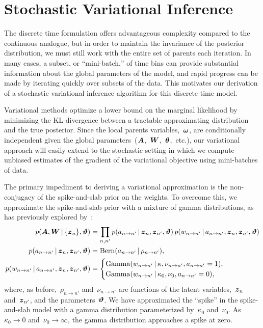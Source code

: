 \section{Stochastic Variational Inference}
The discrete time formulation offers advantageous complexity compared
to the continuous analogue, but in order to maintain the invariance of
the posterior distribution, we must still work with the entire set of
parents each iteration. In many cases, a subset, or ``mini-batch,'' of
time bins can provide substantial information about the global
parameters of the model, and rapid progress can be made by iterating
quickly over subsets of the data. This motivates our derivation of a
stochastic variational inference algorithm \citep{Hoffman-2013}
for this discrete time model.

Variational methods optimize a lower bound on the marginal likelihood
by minimizing the KL-divergence between a tractable approximating
distribution and the true posterior. Since the local parents
variables,~$\boldsymbol{\omega}$, are conditionally independent given the global
parameters~($\boldsymbol{A}$,~$\boldsymbol{W}$,~$\boldsymbol{\theta}$,~etc.), our variational approach will
easily extend to the stochastic setting in which we compute unbiased
estimates of the gradient of the variational objective using
mini-batches of data.

The primary impediment to deriving a variational approximation is the
non-conjugacy of the spike-and-slab prior on the weights.  To overcome
this, we approximate the spike-and-slab prior with a mixture of gamma
distributions, as has previously explored by~\citet{Grabska-2013}:
\begin{align*}
  p(\boldsymbol{A}, \boldsymbol{W} \,|\, \{\boldsymbol{z}_n\}, \boldsymbol{\vartheta})
  &= \prod_{n,n'} p(a_{n \to n'} \,|\, \boldsymbol{z}_n, \boldsymbol{z}_{n'}, \boldsymbol{\vartheta}) \, p(w_{n \to n'} \,|\, a_{n \to n'}, \boldsymbol{z}_n, \boldsymbol{z}_{n'}, \boldsymbol{\vartheta}) \\
  p(a_{n \to n'} \,|\, \boldsymbol{z}_n, \boldsymbol{z}_{n'}, \boldsymbol{\vartheta}) &= \mathrm{Bern}(a_{n \to n'} \,|\, \rho_{n \to n'}), \\
  p(w_{n \to n'} \,|\, a_{n \to n'}, \boldsymbol{z}_n, \boldsymbol{z}_{n'}, \boldsymbol{\vartheta})
  &=
  \begin{cases} 
    \mathrm{Gamma}(w_{n \to n'} \,|\, \kappa, \nu_{n \to n'}, a_{n \to n'} =1), \\
    \mathrm{Gamma}(w_{n \to n'} \,|\, \kappa_0, \nu_0, a_{n \to n'} =0),
  \end{cases}
\end{align*}
where, as before,~$\rho_{n \to n'}$ and~$\nu_{n \to n'}$ are functions
of the latent variables,~$\boldsymbol{z}_n$ and~$\boldsymbol{z}_{n'}$, and the
parameters~$\boldsymbol{\vartheta}$.  We have approximated the ``spike'' in the
spike-and-slab model with a gamma distribution parameterized
by~$\kappa_0$ and~$\nu_0$.  As~$\kappa_0 \to 0$ and~$\nu_0\to \infty$,
the gamma distribution approaches a spike at zero.

